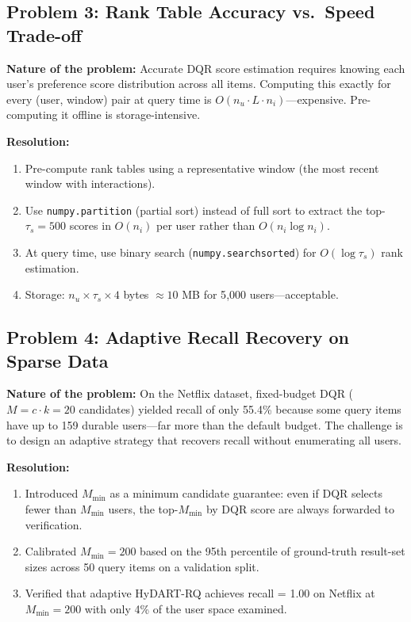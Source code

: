\subsection{Problem 3: Rank Table Accuracy vs.\ Speed Trade-off}

\textbf{Nature of the problem:} Accurate DQR score estimation requires knowing each user's preference score distribution across all items. Computing this exactly for every (user, window) pair at query time is $O(n_u \cdot L \cdot n_i)$---expensive. Pre-computing it offline is storage-intensive.

\textbf{Resolution:}
\begin{enumerate}
  \item Pre-compute rank tables using a representative window (the most recent window with interactions).
  \item Use \texttt{numpy.partition} (partial sort) instead of full sort to extract the top-$\tau_s = 500$ scores in $O(n_i)$ per user rather than $O(n_i \log n_i)$.
  \item At query time, use binary search (\texttt{numpy.searchsorted}) for $O(\log \tau_s)$ rank estimation.
  \item Storage: $n_u \times \tau_s \times 4$ bytes $\approx 10$ MB for 5{,}000 users---acceptable.
\end{enumerate}

\subsection{Problem 4: Adaptive Recall Recovery on Sparse Data}

\textbf{Nature of the problem:} On the Netflix dataset, fixed-budget DQR ($M = c \cdot k = 20$ candidates) yielded recall of only 55.4\% because some query items have up to 159 durable users---far more than the default budget. The challenge is to design an adaptive strategy that recovers recall without enumerating all users.

\textbf{Resolution:}
\begin{enumerate}
  \item Introduced $M_{\min}$ as a minimum candidate guarantee: even if DQR selects fewer than $M_{\min}$ users, the top-$M_{\min}$ by DQR score are always forwarded to verification.
  \item Calibrated $M_{\min} = 200$ based on the 95th percentile of ground-truth result-set sizes across 50 query items on a validation split.
  \item Verified that adaptive HyDART-RQ achieves recall = 1.00 on Netflix at $M_{\min} = 200$ with only 4\% of the user space examined.
\end{enumerate}

